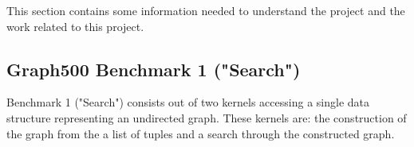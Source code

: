 This section contains some information needed to understand the project and the work related to this project.




\subsection{Graph500 Benchmark 1 ("Search")}
Benchmark 1 ("Search")\cite{graph500-specs} consists out of two kernels accessing a single data structure representing an undirected graph. These kernels are:  the construction of the graph from the a list of tuples and a search through the constructed graph. 

